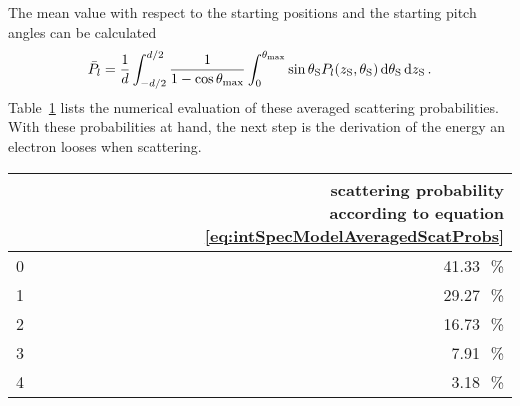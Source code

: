 The mean value with respect to the starting positions and the starting pitch angles can be calculated~\cite{Groh2015}
\begin{equation}
	\label{eq:intSpecModelAveragedScatProbs}
	\bar{P}_l =
	\frac{1}{d}
	\int_{-d/2}^{d/2}
		\frac{1}{1-\cos\theta_\mathrm{max}}
		\int_{0}^{\theta_\mathrm{max}}
			\sin\theta_\mathrm{S}
			P_l(z_\mathrm{S},\theta_\mathrm{S})
		\mathop{}\!\mathrm{d} \theta_\mathrm{S}
	\mathop{}\!\mathrm{d} z_\mathrm{S}
	\text{\,.}
\end{equation}
Table~\ref{tab:intSpecModelAveragedScatProbs} lists the numerical evaluation of these averaged scattering probabilities. With these probabilities at hand, the next step is the derivation of the energy an electron looses when scattering.

\begin{table}[ht]
	\centering
	\begin{tabular}{cr}
		\toprule
		\makecell[tl]{scattering count $l$} &
		\makecell[tl]{scattering probability\\ according to equation \eqref{eq:intSpecModelAveragedScatProbs}}\\
		\hline
		0 & 41.33\,\SI{}{\percent }\\
		1 & 29.27\,\SI{}{\percent} \\
		2 & 16.73\,\SI{}{\percent} \\
		3 &  7.91\,\SI{}{\percent} \\
		4 &  3.18\,\SI{}{\percent} \\
		\bottomrule
	\end{tabular}
	\label{tab:intSpecModelAveragedScatProbs}
\end{table}

